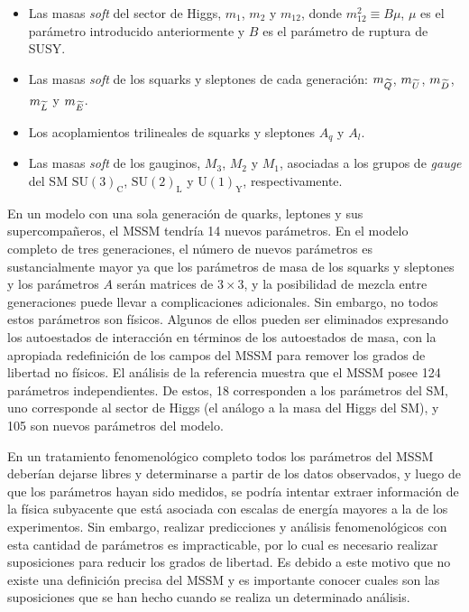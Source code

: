 \begin{itemize}
\item Las masas \emph{soft} del sector de Higgs, $m_1$, $m_2$ y $m_{12}$, donde $m_{12}^2 \equiv B\mu$,
  $\mu$ es el parámetro introducido anteriormente y $B$ es el parámetro de ruptura
  de SUSY.

\item Las masas \emph{soft} de los squarks y sleptones de cada generación:
  $m_{\widetilde{Q}}$, $m_{\widetilde{U}}$, $m_{\widetilde{D}}$, $m_{\widetilde{L}}$ y
  $m_{\widetilde{E}}$.

\item Los acoplamientos trilineales de squarks y sleptones $A_q$ y $A_l$.

\item Las masas \emph{soft} de los gauginos, $M_3$, $M_2$ y $M_1$, asociadas a los
  grupos de \emph{gauge} del SM $\text{SU}(3)_\text{C}$, $\text{SU}(2)_\text{L}$ y $\text{U}(1)_\text{Y}$, respectivamente.

\end{itemize}


En un modelo con una sola generación de quarks, leptones y sus
supercompa\~neros, el MSSM tendría 14 nuevos parámetros. En el modelo
completo de tres generaciones, el número de nuevos parámetros es sustancialmente
mayor ya que los parámetros de masa de los squarks y sleptones y los parámetros
$A$ serán matrices de $3 \times 3$, y la posibilidad de mezcla entre
generaciones puede llevar a complicaciones adicionales. Sin embargo, no todos
estos parámetros son físicos. Algunos de ellos pueden ser eliminados
expresando los autoestados de interacción en términos de los autoestados de
masa, con la apropiada redefinición de los campos del MSSM para remover los
grados de libertad no físicos. El análisis de la referencia
\cite{Dimopoulos:1995ju} muestra que el MSSM posee 124 parámetros
independientes. De estos, 18 corresponden a los parámetros del SM, uno
corresponde al sector de Higgs (el análogo a la masa del Higgs del SM), y 105
son nuevos parámetros del modelo.

En un tratamiento fenomenológico completo todos los parámetros del MSSM deberían
dejarse libres y determinarse a partir de los datos observados, y luego de que
los parámetros hayan sido medidos, se podría intentar extraer información de la
física subyacente que está asociada con escalas de energía mayores a la de los
experimentos. Sin embargo, realizar predicciones y análisis fenomenológicos con esta
cantidad de parámetros es impracticable, por lo cual es necesario realizar
suposiciones para reducir los grados de libertad. Es debido a este motivo que no
existe una definición precisa del MSSM y es importante conocer cuales son las
suposiciones que se han hecho cuando se realiza un determinado análisis.


